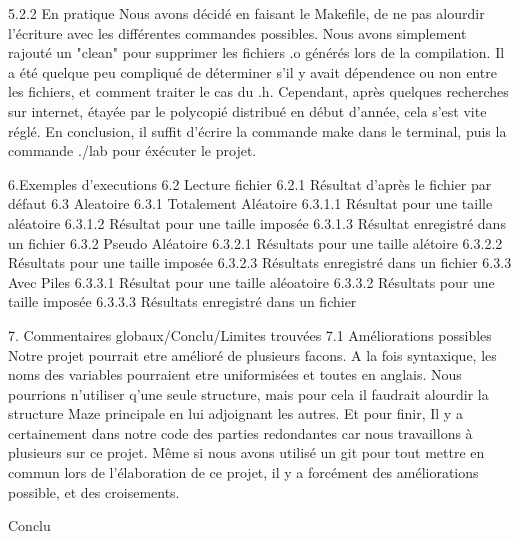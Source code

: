 5.2.2 En pratique
Nous avons décidé en faisant le Makefile, de ne pas alourdir l'écriture avec les différentes commandes possibles.
Nous avons simplement rajouté un "clean" pour supprimer les fichiers .o générés lors de la compilation. Il a été quelque peu compliqué de déterminer s'il y avait dépendence ou non entre les fichiers, et comment traiter le cas du .h. Cependant, après quelques recherches sur internet, étayée par le polycopié distribué en début d'année, cela s'est vite réglé. 
En conclusion, il suffit d'écrire la commande make dans le terminal, puis la commande ./lab pour éxécuter le projet.

6.Exemples d'executions
6.2 Lecture fichier
6.2.1 Résultat d'après le fichier par défaut
6.3 Aleatoire
6.3.1 Totalement Aléatoire
6.3.1.1 Résultat pour une taille aléatoire
6.3.1.2 Résultat pour une taille imposée
6.3.1.3 Résultat enregistré dans un fichier
6.3.2 Pseudo Aléatoire
6.3.2.1 Résultats pour une taille alétoire
6.3.2.2 Résultats pour une taille imposée
6.3.2.3 Résultats enregistré dans un fichier
6.3.3 Avec Piles
6.3.3.1 Résultat pour une taille aléoatoire
6.3.3.2 Résultats pour une taille imposée
6.3.3.3 Résultats enregistré dans un fichier


7. Commentaires globaux/Conclu/Limites trouvées
7.1 Améliorations possibles
Notre projet pourrait etre amélioré de plusieurs facons. A la fois syntaxique, les noms des variables pourraient etre uniformisées et toutes en anglais. Nous pourrions n'utiliser q'une seule structure, mais pour cela il faudrait alourdir la structure Maze principale en lui adjoignant les autres. Et pour finir, Il y a certainement dans notre code des parties redondantes car nous travaillons à plusieurs sur ce projet. Même si nous avons utilisé un git pour tout mettre en commun lors de l'élaboration de ce projet, il y a forcément des améliorations possible, et des croisements.

Conclu
